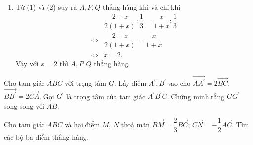 \begin{bt}
{\begin{enumerate}
		Vậy $\overrightarrow{A Q}=\dfrac{(2+x)}{2(1+x)} \overrightarrow{u}+\dfrac{x}{1+x} \overrightarrow{v}$. \hfill (2)
		\item Từ (1) và (2) suy ra $A, P, Q$ thẳng hàng khi và chỉ khi
		\allowdisplaybreaks
		\begin{align*}
			& \dfrac{2+x}{2(1+x)}: \dfrac{1}{3}=\dfrac{x}{1+x}: \dfrac{1}{3} \\
			\Leftrightarrow & \dfrac{2+x}{2(1+x)}=\dfrac{x}{1+x}\\
			\Leftrightarrow &x=2 .
		\end{align*}
		Vậy với $x=2$ thì $A, P, Q$ thẳng hàng.
	\end{enumerate}
	}
\end{bt}

\begin{bt}%
	Cho tam giác $A B C$ với trọng tâm $G$. Lấy điểm $A^{\prime}, B^{\prime}$ sao cho $\overrightarrow{A A^{\prime}}=2 \overrightarrow{B C}$, $\overrightarrow{B B^{\prime}}=2 \overrightarrow{C A}$. Gọi $G^{\prime}$ là trọng tâm của tam giác $A^{\prime} B^{\prime} C$. Chứng minh rằng $G G^{\prime}$ song song với $A B$.
\end{bt}

\begin{bt}%
	Cho tam giác $ABC$ và hai điểm $M$, $N$ thoả mãn $\overrightarrow{BM}=\dfrac{2}{3}\overrightarrow{BC}$; $\overrightarrow{CN}=-\dfrac{1}{2}\overrightarrow{AC}$. Tìm các bộ ba điểm thẳng hàng.
\end{bt}

